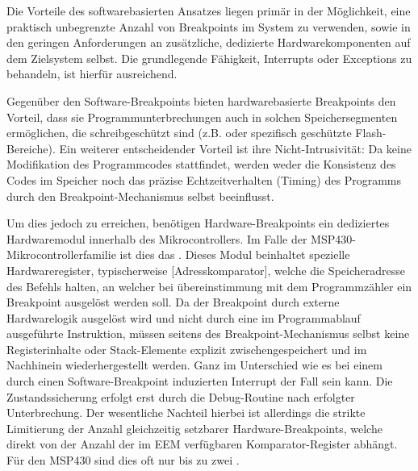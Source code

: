 Die Vorteile des softwarebasierten Ansatzes liegen prim\"ar in der M\"oglichkeit, eine praktisch unbegrenzte Anzahl von Breakpoints im System zu verwenden, sowie in den geringen Anforderungen an zus\"atzliche, dedizierte Hardwarekomponenten auf dem Zielsystem selbst. Die grundlegende F\"ahigkeit, Interrupts oder Exceptions zu behandeln, ist hierf\"ur ausreichend. 

Gegen\"uber den Software-Breakpoints bieten hardwarebasierte Breakpoints den Vorteil, dass sie Programmunterbrechungen auch in solchen Speichersegmenten erm\"oglichen, die schreibgesch\"utzt sind (z.B.  oder spezifisch gesch\"utzte Flash-Bereiche). Ein weiterer entscheidender Vorteil ist ihre Nicht-Intrusivit\"at: Da keine Modifikation des Programmcodes stattfindet, werden weder die Konsistenz des Codes im Speicher noch das pr\"azise Echtzeitverhalten (Timing) des Programms durch den Breakpoint-Mechanismus selbst beeinflusst. 

\newpage
Um dies jedoch zu erreichen, ben\"otigen Hardware-Breakpoints ein dediziertes Hardwaremodul innerhalb des Mikrocontrollers. Im Falle der MSP430-Mikrocontrollerfamilie ist dies das  . Dieses Modul beinhaltet spezielle Hardwareregister, typischerweise [Adresskomparator], welche die Speicheradresse des Befehls halten, an welcher bei \"ubereinstimmung mit dem Programmz\"ahler ein Breakpoint ausgel\"ost werden soll. Da der Breakpoint durch externe Hardwarelogik ausgel\"ost wird und nicht durch eine im Programmablauf ausgef\"uhrte Instruktion, m\"ussen seitens des Breakpoint-Mechanismus selbst keine Registerinhalte oder Stack-Elemente explizit zwischengespeichert und im Nachhinein wiederhergestellt werden. Ganz im Unterschied wie es bei einem durch einen Software-Breakpoint induzierten Interrupt der Fall sein kann. Die Zustandssicherung erfolgt erst durch die Debug-Routine nach erfolgter Unterbrechung. Der wesentliche Nachteil hierbei ist allerdings die strikte Limitierung der Anzahl gleichzeitig setzbarer Hardware-Breakpoints, welche direkt von der Anzahl der im EEM verf\"ugbaren Komparator-Register abh\"angt. F\"ur den MSP430 sind dies oft nur bis zu zwei .

